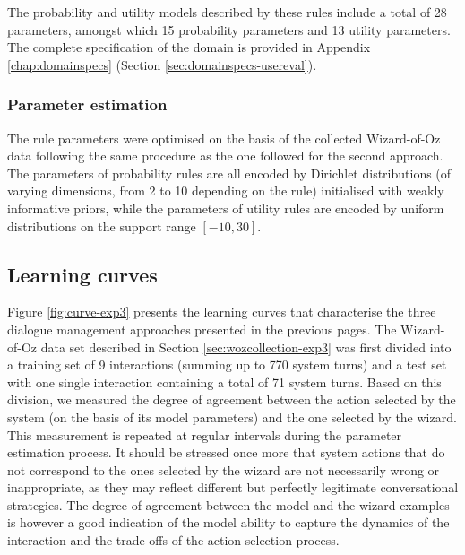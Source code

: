 \begin{itemize}
\end{itemize}

The probability and utility models described by these rules include a total of 28 parameters, amongst which 15 probability parameters and 13 utility parameters.  The complete specification of the domain is provided in Appendix \ref{chap:domainspecs} (Section \ref{sec:domainspecs-usereval}). 

\subsubsection*{Parameter estimation}

The rule parameters were optimised on the basis of the collected Wizard-of-Oz data following the same procedure as the one followed for the second approach.  The parameters of probability rules are all encoded by Dirichlet distributions (of varying dimensions, from 2 to 10 depending on the rule) initialised with weakly informative priors, while the parameters of utility rules are encoded by uniform distributions on the support range $[-10, 30]$.  


\subsection{Learning curves}
\label{sec:learningcurve-exp3}

Figure \ref{fig:curve-exp3} presents the learning curves that characterise the three dialogue management approaches presented in the previous pages. The Wizard-of-Oz data set described in Section \ref{sec:wozcollection-exp3} was first divided into a training set of 9 interactions (summing up to 770 system turns) and a test set with one single interaction containing a total of 71 system turns. Based on this division, we measured the degree of agreement between the action selected by the system (on the basis of its model parameters) and the one selected by the wizard. This measurement is repeated at regular intervals during the parameter estimation process.  It should be stressed once more that system actions that do not correspond to the ones selected by the wizard are not necessarily wrong or inappropriate, as they may reflect different but perfectly legitimate conversational strategies. The degree of agreement between the model and the wizard examples is however a good indication of the model ability to capture the dynamics of the interaction and the trade-offs of the action selection process. 

